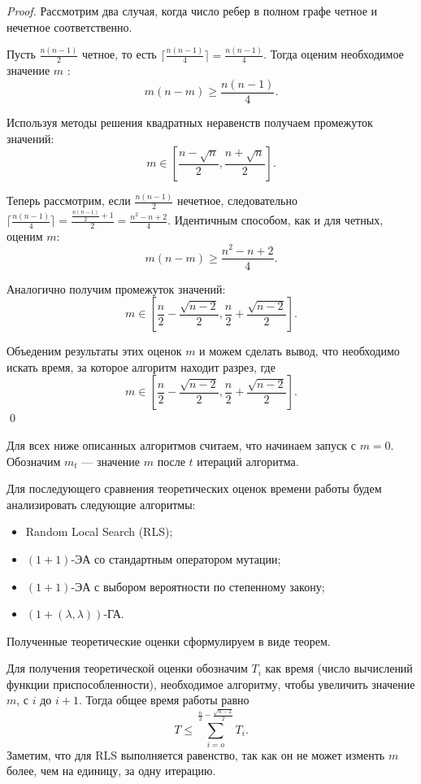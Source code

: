 \documentclass[times]{itmo-student-thesis}
\newcommand{\alglambdaf}{${(1 + (\lambda , \lambda))}$-ГА\xspace}
\newcommand{\oea}{\mbox{$(1 + 1)$-ЭА}\xspace}
\begin{document}
\begin{proof}
  Рассмотрим два случая, когда число ребер в полном графе четное и нечетное соответственно.

  Пусть $\frac{n(n-1)}{2}$ четное, то есть $\lceil \frac{n(n-1)}{4} \rceil = \frac{n(n-1)}{4}$.
  Тогда оценим необходимое значение $m$ :
  $$
    m(n-m) \ge \frac{n(n-1)}{4}.
  $$

  Используя методы решения квадратных неравенств получаем промежуток значений:
  $$
  m \in \left[\frac{n - \sqrt{n}}{2}, \frac{n + \sqrt{n}}{2}\right].
  $$

  Теперь рассмотрим, если $\frac{n(n-1)}{2}$ нечетное, следовательно $\lceil \frac{n(n-1)}{4} \rceil = \frac{\frac{n(n-1)}{2}+1}{2} = \frac{n^2-n+2}{4}$.
  Идентичным способом, как и для четных, оценим $m$:
  $$
    m(n-m) \ge \frac{n^2-n+2}{4}.
  $$

  Аналогично получим промежуток значений:
  $$
  m \in \left[\frac{n}{2} -\frac{\sqrt{n-2}}{2},  \frac{n}{2} + \frac{\sqrt{n-2}}{2}\right].
  $$

  Объеденим результаты этих оценок $m$ и можем сделать вывод, что необходимо искать время, за которое алгоритм находит разрез, где
  $$
  m \in \left[\frac{n}{2} -\frac{\sqrt{n-2}}{2},  \frac{n}{2} + \frac{\sqrt{n-2}}{2}\right].
  $$
  \qed
\end{proof}

Для всех ниже описанных алгоритмов считаем, что начинаем запуск с $m = 0$. Обозначим $m_t$ --- значение $m$ после $t$ итераций алгоритма.

Для последующего сравнения теоретических оценок времени работы будем анализировать следующие алгоритмы:
\begin{itemize}
  \item Random Local Search (RLS);
  \item \oea со стандартным оператором мутации;
  \item \oea с выбором вероятности по степенному закону;
  \item \alglambdaf.
\end{itemize}

Полученные теоретические оценки сформулируем в виде теорем.


Для получения теоретической оценки обозначим $T_i$ как время (число вычислений функции приспособленности), необходимое алгоритму, чтобы увеличить значение $m$, с $i$ до $i + 1$.
Тогда общее время работы равно
$$
  T \le \sum_{i=o}^{\frac{n}{2} - \frac{\sqrt{n-2}}{2}} T_i.
$$
Заметим, что для RLS выполняется равенство, так как он не может изменть $m$ более, чем на единицу, за одну итерацию.
\end{document}
